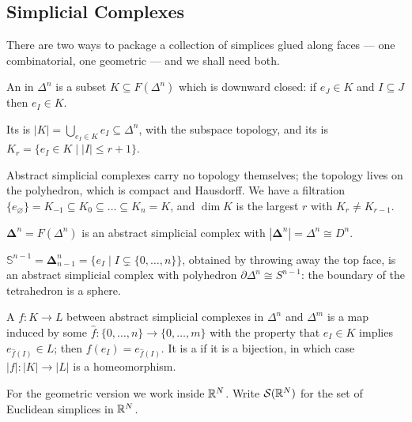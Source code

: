 \documentclass[a4paper]{scrartcl}
\newcommand{\bDelta}{\boldsymbol{\Delta}}
\newcommand{\sS}{\mathbb{S}}
\begin{document}
\subsection{Simplicial Complexes}

There are two ways to package a collection of simplices glued along faces --- one
combinatorial, one geometric --- and we shall need both.

\begin{definition}
	An  in $\Delta^n$ is a subset $K \subseteq F(\Delta^n)$ which is downward closed: if $e_J \in K$ and $I \subseteq J$ then $e_I \in K$.

	Its  is $|K| = \bigcup_{e_I \in K} e_I \subseteq \Delta^n$, with the subspace topology, and its  is $K_r = \{e_I \in K \mid |I| \leq r+1\}$.
\end{definition}

Abstract simplicial complexes carry no topology themselves; the topology lives on the
polyhedron, which is compact and Hausdorff. We have a filtration
$\{e_\varnothing\} = K_{-1} \subseteq K_0 \subseteq \dots \subseteq K_n = K$, and
$\dim K$ is the largest $r$ with $K_r \neq K_{r-1}$.

\begin{example} \label{ex:bdelta}
	$\bDelta^n = F(\Delta^n)$ is an abstract simplicial complex with $|\bDelta^n| = \Delta^n \cong D^n$.
\end{example}

\begin{example} \label{ex:ssphere}
	$\sS^{n-1} = \bDelta^n_{n-1} = \{e_I \mid I \subsetneq \{0,\dots,n\}\}$, obtained by throwing away the top face, is an abstract simplicial complex with polyhedron $\partial \Delta^n \cong S^{n-1}$: the boundary of the tetrahedron is a sphere.
\end{example}

\begin{definition}
	A  $f: K \to L$ between abstract simplicial complexes in $\Delta^n$ and $\Delta^m$ is a map induced by some $\hat f: \{0,\dots,n\}\to\{0,\dots,m\}$ with the property that $e_I \in K$ implies $e_{\hat f(I)} \in L$; then $f(e_I) = e_{\hat f(I)}$. It is a  if it is a bijection, in which case $|f|: |K|\to|L|$ is a homeomorphism.
\end{definition}

For the geometric version we work inside $\mathbb{R}^N$. Write $\mathcal{S}(\mathbb{R}^N)$ for the set of
Euclidean simplices in $\mathbb{R}^N$.
\end{document}
